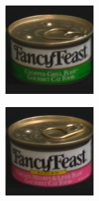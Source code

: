 \begin{figure}[tbp]
\begin{subfigure}{80pt}
    \caption{}
	\end{subfigure}
	\begin{subfigure}{80pt}
        \centering
    \includegraphics[width=\textwidth]{figures/coil_original/29.png}
    \caption{}
	\end{subfigure}
	\begin{subfigure}{80pt}
        \centering
    \includegraphics[width=\textwidth]{figures/coil_original/32.png}

\end{subfigure}
\end{figure}
